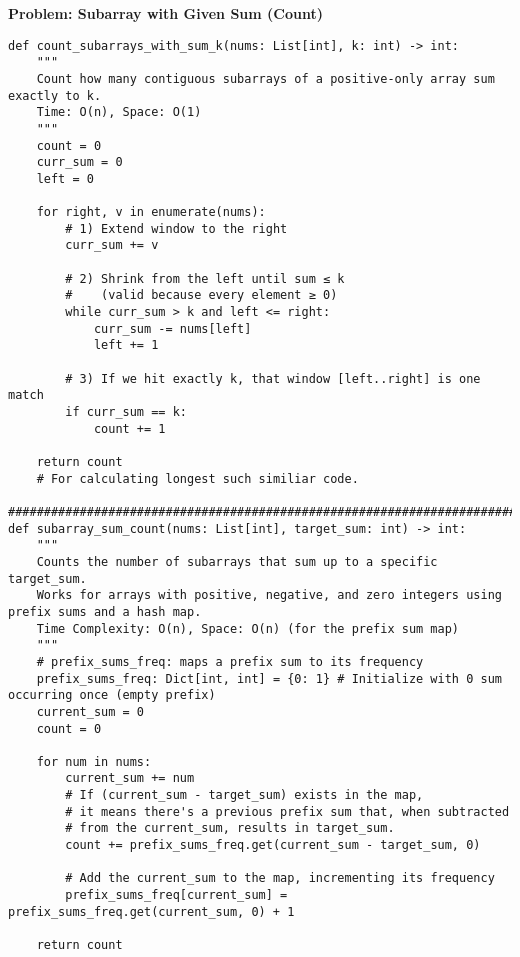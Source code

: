\noindent\textbf{Problem: Subarray with Given Sum (Count)}
\begin{verbatim}
def count_subarrays_with_sum_k(nums: List[int], k: int) -> int:
    """
    Count how many contiguous subarrays of a positive-only array sum exactly to k.
    Time: O(n), Space: O(1)
    """
    count = 0
    curr_sum = 0
    left = 0

    for right, v in enumerate(nums):
        # 1) Extend window to the right
        curr_sum += v

        # 2) Shrink from the left until sum ≤ k
        #    (valid because every element ≥ 0)
        while curr_sum > k and left <= right:
            curr_sum -= nums[left]
            left += 1

        # 3) If we hit exactly k, that window [left..right] is one match
        if curr_sum == k:
            count += 1

    return count
    # For calculating longest such similiar code. 
    ####################################################################################
def subarray_sum_count(nums: List[int], target_sum: int) -> int:
    """
    Counts the number of subarrays that sum up to a specific target_sum.
    Works for arrays with positive, negative, and zero integers using prefix sums and a hash map. 
    Time Complexity: O(n), Space: O(n) (for the prefix sum map)
    """
    # prefix_sums_freq: maps a prefix sum to its frequency
    prefix_sums_freq: Dict[int, int] = {0: 1} # Initialize with 0 sum occurring once (empty prefix)
    current_sum = 0
    count = 0

    for num in nums:
        current_sum += num
        # If (current_sum - target_sum) exists in the map,
        # it means there's a previous prefix sum that, when subtracted
        # from the current_sum, results in target_sum.
        count += prefix_sums_freq.get(current_sum - target_sum, 0)
        
        # Add the current_sum to the map, incrementing its frequency
        prefix_sums_freq[current_sum] = prefix_sums_freq.get(current_sum, 0) + 1
        
    return count
\end{verbatim}

